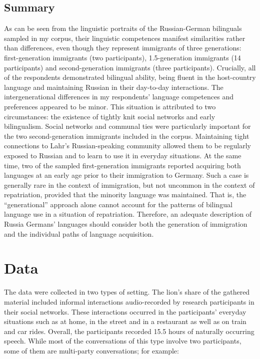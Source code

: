 \subsection{Summary}
\begin{sloppypar}
As can be seen from the linguistic portraits of the  Russian-German bilinguals sampled in my corpus, their linguistic competences manifest similarities rather than differences, even though they represent immigrants of three generations: first-generation immigrants (two participants), 1.5-generation immigrants (14 participants) and  second-generation immigrants (three participants). Crucially, all of the respondents demonstrated bilingual ability, being fluent in the host-country language and maintaining Russian in their day-to-day interactions. The intergenerational differences in my respondents' language competences and preferences appeared to be minor. This situation is attributed to two circumstances: the existence of tightly knit social networks and early bilingualism. Social networks and communal ties were particularly important for the two second-generation immigrants included in the corpus. Maintaining tight connections to Lahr's Russian-speaking community allowed them to be regularly exposed to Russian and to learn to use it in everyday situations. At the same time, two of the sampled first-generation immigrants reported acquiring both languages at an early age prior to their immigration to Germany. Such a case is generally rare in the context of immigration, but not uncommon in the context of repatriation, provided that the minority language was maintained. That is, the “generational” approach alone cannot account for the patterns of bilingual language use in a situation of repatriation. Therefore, an adequate description of Russia Germans' languages should consider both the generation of immigration and the individual paths of language acquisition.
\end{sloppypar}

\section{Data}

The data were collected in two types of setting. The lion's share of the gathered material included informal interactions audio-recorded by research participants in their social networks. These interactions occurred in the participants' everyday situations such as at home, in the street and in a restaurant as well as on train and car rides. Overall, the participants recorded 15.5 hours of naturally occurring speech. While most of the conversations of this type involve two participants, some of them are multi-party conversations; for example: 

